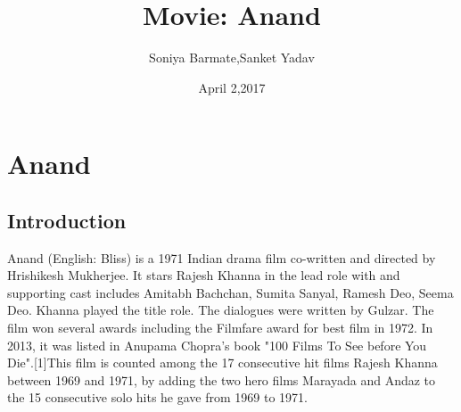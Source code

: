 \documentclass[11pt]{article}
\begin{document}
 

\title{Movie: Anand}
\author{Soniya Barmate,Sanket Yadav}
\date{April 2,2017}
\maketitle
\section*{Anand}
\subsection*{Introduction}
Anand (English: Bliss) is a 1971 Indian drama film co-written and directed by Hrishikesh Mukherjee.
It stars Rajesh Khanna in the lead role with and supporting cast includes Amitabh Bachchan, Sumita Sanyal, 
Ramesh Deo, Seema Deo. Khanna played the title role. The dialogues were written by Gulzar. The film won 
several awards including the Filmfare award for best film in 1972. In 2013, it was listed in Anupama Chopra's
book "100 Films To See before You Die".[1]This film is counted among the 17 consecutive hit films Rajesh Khanna
between 1969 and 1971, by adding the two hero films Marayada and Andaz to the 15 consecutive solo hits he gave 
from 1969 to 1971.
\end{document}
